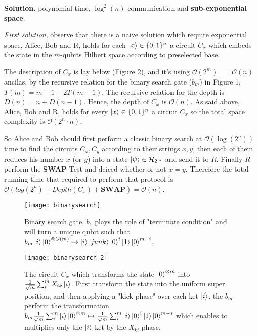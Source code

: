 \documentclass{article}
\newcommand{\onotation}[1]{\(\mathcal{O} \left( {#1}  \right) \)}
\newcommand{\ona}[1]{\onotation{#1}}
\begin{document}
\begin{enumerate}
\textbf{Solution.} polynomial time, \( \log^2(n) \) communication and \textbf{sub-exponential space}.  

\textit{First solution}, observe that there is a naive solution which require exponential space, Alice, Bob and R, holds for each \( \ket{x} \in \{0,1\}^n \) a circuit \( C_x \) which embeds the state in the \(m\)-qubits Hilbert space according to preselected base.

The description of \(C_x\) is lay below (Figure 2), and it's using \ona{ 2^{m} } \( = \) \ona{n} ancilas, by the recursive relation for the binary search gate (\(b_m\)) in Figure 1, \( T(m)= m-1 + 2T(m-1)\). The recursive relation for the depth is \( D(n)=n + D(n-1) \). Hence, the depth of \(C_x\) is \ona{n}. As said above, Alice, Bob and R, holds for every  \( \ket{x} \in \{0,1\}^n \) a circuit \(C_x\) so the total space complexity is \ona{2^n \cdot n}. 

So Alice and Bob should first perform a classic binary search at \ona{\log(2^n)} time to find the circuits \(C_x , C_y\) according to their strings \(x,y\), then each of them reduces his number \(x\) (or \( y \)) into a state \( \ket{\psi} \in \mathcal{H}_{2^m} \) and send it to \(R\). Finally \(R\) perform the \textbf{SWAP} Test and deiced whether or not \(x = y\). Therefore the total running time that required to perform that protocol is \(
    \mathcal{O}\left(log(2^n) + Depth(C_x) + \mathbf{SWAP}\right) = \mathcal{O}\left(n\right)      
\).
\begin{figure}[H]
\texttt{[image: binarysearch]}
\caption{Binary search gate, \(b_1\) plays the role of "terminate condition" and will turn a unique qubit such that \(b_m\ket{i}\ket{0}^{\otimes O(m)} \mapsto \ket{i}\ket{junk}\ket{0}^{i}\ket{1}\ket{0}^{m-i}\). }
    \label{fig:simulation_cases}
\end{figure}


\begin{figure}[H]
\texttt{[image: binarysearch\_2]}
\caption{The circuit \( C_x \) which transforms the state \(\ket{0}^{\otimes m}\) into \(\frac{1}{\sqrt{m}}\sum_{i}^{m}{X_{ik}\ket{i}}\). First transform the state into the uniform super position, and then applying a "kick phase" over each ket \( \ket{i} \). the \(b_m\) perform the transformation \(b_m \frac{1}{\sqrt{m}}\sum_{i}^{m}{\ket{i} \ket{0}^{\otimes m} } \mapsto \frac{1}{\sqrt{m}}\sum_{i}^{m}{\ket{i} \ket{0}^{i }}\ket{1}\ket{0}^{m - i }  \)  which enables to multiplies only the \(\ket{i}\)-ket by the \(X_{ki}\) phase. }
    \label{fig:simulation_cases}
\end{figure}


\end{enumerate}
\end{document}
